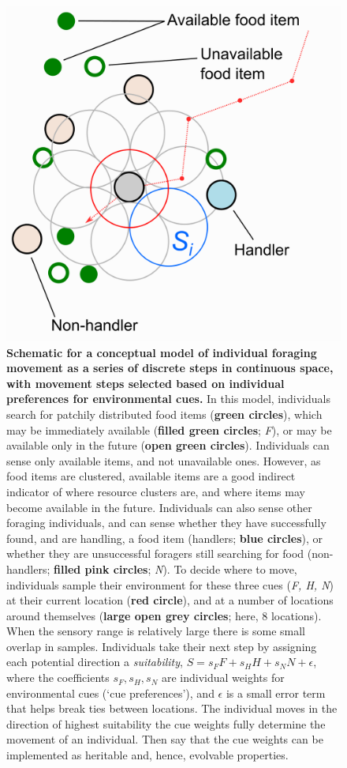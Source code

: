\begin{interludeenv}
\begin{figure}[!h]
    \centering
    \includegraphics[width=0.8\linewidth]{figures/introduction/fig_schematic.png}
    \caption{
        \textbf{Schematic for a conceptual model of individual foraging movement as a series of discrete steps in continuous space, with movement steps selected based on individual preferences for environmental cues.} 
        In this model, individuals search for patchily distributed food items (\textbf{green circles}), which may be immediately available (\textbf{filled green circles}; \emph{F}), or may be available only in the future (\textbf{open green circles}). 
        Individuals can sense only available items, and not unavailable ones. However, as food items are clustered, available items are a good indirect indicator of where resource clusters are, and where items may become available in the future. 
        Individuals can also sense other foraging individuals, and can sense whether they have successfully found, and are handling, a food item (handlers; \textbf{blue circles}), or whether they are unsuccessful foragers still searching for food (non-handlers; \textbf{filled pink circles}; \emph{N}). 
        To decide where to move, individuals sample their environment for these three cues (\emph{F, H, N}) at their current location (\textbf{red circle}), and at a number of locations around themselves (\textbf{large open grey circles}; here, 8 locations). 
        When the sensory range is relatively large there is some small overlap in samples. 
        Individuals take their next step by assigning each potential direction a \emph{suitability}, $S = s_FF + s_HH + s_NN + \epsilon$, where the coefficients $s_F, s_H, s_N$ are individual weights for environmental cues (`cue preferences'), and $\epsilon$ is a small error term that helps break ties between locations.
        The individual moves in the direction of highest suitability the cue weights fully determine the movement of an individual. Then say that the cue weights can be implemented as heritable and, hence, evolvable properties.
    }
    \label{fig:demo_schematic}
  \end{figure}


\end{interludeenv}
